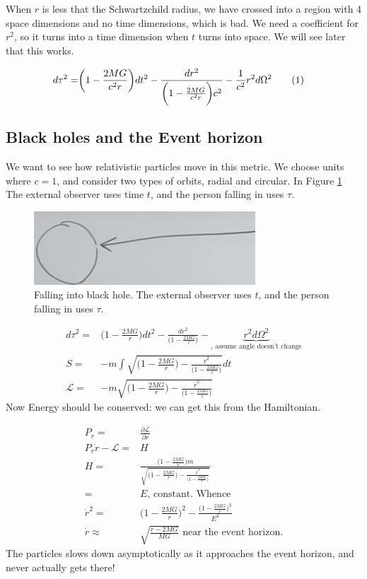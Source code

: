 \documentclass[]{article}
\newcommand\numberthis{\addtocounter{equation}{1}\tag{\theequation}}
\newcommand{\Lagr}{\mathscr{L}}
\begin{document}
{When $r$ is less that the Schwartzchild radius, we have crossed into a region with 4 space dimensions and no time dimensions, which is bad. We need a coefficient for $r^2$, so it turns into a time dimension when $t$ turns into space. We will see later that this works.

\begin{align*}
	d \tau^2 =& \bigg(1-\frac{2 MG}{c^2 r}\bigg) dt^2 - \frac{dr^2}{\bigg(1-\frac{2 MG}{c^2 r}\bigg)c^2} - \frac{1}{c^2} r^2 d\Omega^2 \numberthis \label{eq:schwartzchild}
\end{align*}

\subsection{Black holes and the Event horizon}

We want to see how relativistic particles move in this metric. We choose units where $c=1$, and consider two types of orbits, radial and circular. In Figure \ref{fig:gr-5-falling-in}  The external observer uses time $t$, and the person falling in uses $\tau$.

\begin{figure}[H]
	\caption[Falling into black hole]{Falling into black hole. The external observer uses $t$, and the person falling in uses $\tau$.}\label{fig:gr-5-falling-in}
	\includegraphics{gr-5-falling-in}	
\end{figure}

\begin{align*}
d \tau^2 =& \bigg(1-\frac{2 MG}{ r}\bigg) dt^2 - \frac{dr^2}{\bigg(1-\frac{2 MG}{ r}\bigg)} - \underbrace{ r^2 d\Omega^2}_\text{, assume angle doesn't change}\\
S =& -m \int \sqrt{\big(1-\frac{2 MG}{ r}\big)  - \frac{\dot{r}^2}{\big(1-\frac{2 MG}{ r}\big)}} dt\\
\Lagr  =& -m \sqrt{\big(1-\frac{2 MG}{ r}\big)  - \frac{\dot{r}^2}{\big(1-\frac{2 MG}{ r}\big)}} 
\end{align*}
Now Energy should be conserved: we can get this from the Hamiltonian.

\begin{align*}
	P_r =& \frac{\partial \Lagr}{\partial r}\\
	P_r \dot{r} - \Lagr =& H\\
	H =& \frac{\big(1-\frac{2MG}{r}\big)m}{\sqrt{\big(1-\frac{2 MG}{ r}\big)  - \frac{\dot{r}^2}{\big(1-\frac{2 MG}{ r}\big)}}}\\
	=& E \text{, constant. Whence}\\
	\dot{r}^2 =& \big(1-\frac{2MG}{r}\big)^2- \frac{\big(1-\frac{2MG}{r}\big)^3}{E^2}\\
	\dot{r} \approx & \sqrt{\frac{r-2MG}{MG}} \text{ near the event horizon.}
\end{align*}
The particles slows down asymptotically as it approaches the event horizon, and never actually gets there!

}
\end{document}
